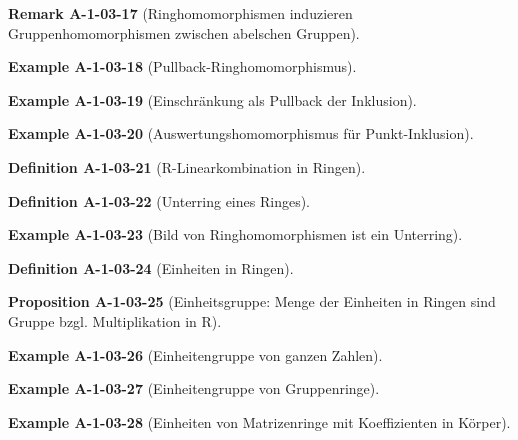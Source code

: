 \documentclass[10pt, letterpaper]{article}
\newcommand{\CustomHeading}[3]{%
  \par\medskip\noindent%
  \textbf{#1 #2} \textnormal{(#3)}.\enskip%
}
\newenvironment{DEF}[2]{\CustomHeading{Definition}{#1}{#2}}{}
\newenvironment{PROP}[2]{\CustomHeading{Proposition}{#1}{#2}}{}
\newenvironment{REM}[2]{\CustomHeading{Remark}{#1}{#2}}{}
\newenvironment{EXA}[2]{\CustomHeading{Example}{#1}{#2}}{}
\begin{document}
\begin{REM}{A-1-03-17}{Ringhomomorphismen induzieren Gruppenhomomorphismen zwischen abelschen Gruppen}
\end{REM}

\begin{EXA}{A-1-03-18}{Pullback-Ringhomomorphismus}
\end{EXA}

\begin{EXA}{A-1-03-19}{Einschränkung als Pullback der Inklusion}
\end{EXA}

\begin{EXA}{A-1-03-20}{Auswertungshomomorphismus für Punkt-Inklusion}
\end{EXA}

\begin{DEF}{A-1-03-21}{R-Linearkombination in Ringen}
\end{DEF}

\begin{DEF}{A-1-03-22}{Unterring eines Ringes}
\end{DEF}

\begin{EXA}{A-1-03-23}{Bild von Ringhomomorphismen ist ein Unterring}
\end{EXA}

\begin{DEF}{A-1-03-24}{Einheiten in Ringen}
\end{DEF}

\begin{PROP}{A-1-03-25}{Einheitsgruppe: Menge der Einheiten in Ringen sind Gruppe bzgl. Multiplikation in R}
\end{PROP}

\begin{EXA}{A-1-03-26}{Einheitengruppe von ganzen Zahlen}
\end{EXA}

\begin{EXA}{A-1-03-27}{Einheitengruppe von Gruppenringe}
\end{EXA}

\begin{EXA}{A-1-03-28}{Einheiten von Matrizenringe mit Koeffizienten in Körper}
\end{EXA}
\end{document}
